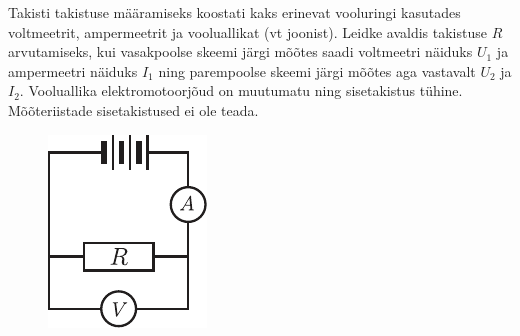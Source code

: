 \documentclass[10pt]{article}
\begin{document}
{%

Takisti takistuse määramiseks koostati kaks erinevat vooluringi kasutades voltmeetrit, ampermeetrit ja vooluallikat (vt joonist). Leidke avaldis takistuse $R$ arvutamiseks, kui vasakpoolse skeemi järgi mõõtes saadi voltmeetri näiduks $U_1$ ja ampermeetri näiduks $I_1$ ning parempoolse skeemi järgi mõõtes aga vastavalt $U_2$ ja $I_2$. Vooluallika elektromotoorjõud on muutumatu ning sisetakistus tühine. Mõõteriistade sisetakistused ei ole teada.

\begin{figure}[h]
	\centering
	\begin{minipage}[b]{0.25\textwidth}
		\includegraphics[width=\linewidth]{2005-v2g-04-yl1}
	\end{minipage}
	\hspace{30pt}
	\begin{minipage}[b]{0.3\textwidth}

\end{minipage}
\end{figure}}
\end{document}
